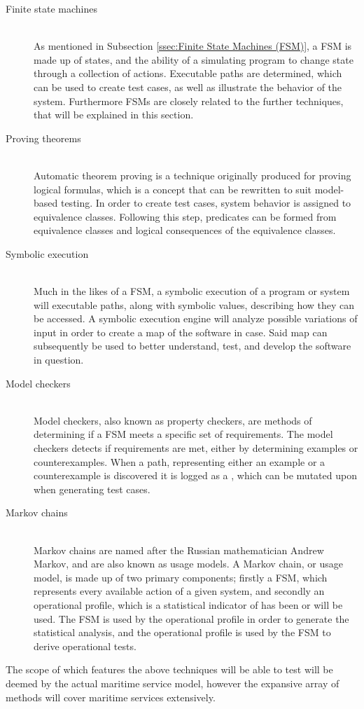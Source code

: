 \begin{description}
	\item[Finite state machines]\ \\
		As mentioned in Subsection \ref{ssec:Finite State Machines (FSM)}, a FSM is made up of states, and the ability of a simulating program to change state through a collection of actions. Executable paths are determined, which can be used to create test cases, as well as illustrate the behavior of the system. Furthermore FSMs are closely related to the further techniques, that will be explained in this section.
	\item[Proving theorems]\ \\
		Automatic theorem proving is a technique originally produced for proving logical formulas, which is a concept that can be rewritten to suit model-based testing. In order to create test cases, system behavior is assigned to equivalence classes. Following this step, predicates can be formed from equivalence classes and logical consequences of the equivalence classes. 
	\item[Symbolic execution]\ \\
		Much in the likes of a FSM, a symbolic execution of a program or system will executable paths, along with symbolic values, describing how they can be accessed. A symbolic execution engine will analyze possible variations of input in order to create a map of the software in case. Said map can subsequently be used to better understand, test, and develop the software in question.
	\item[Model checkers]\ \\
		Model checkers, also known as property checkers, are methods of determining if a FSM meets a specific set of requirements. The model checkers detects if requirements are met, either by determining examples or counterexamples. When a path, representing either an example or a counterexample is discovered it is logged as a , which can be mutated upon when generating test cases.
	\item[Markov chains]\ \\
		Markov chains are named after the Russian mathematician Andrew Markov, and are also known as usage models. A Markov chain, or usage model, is made up of two primary components; firstly a FSM, which represents every available action of a given system, and secondly an operational profile, which is a statistical indicator of has been or will be used. The FSM is used by the operational profile in order to generate the statistical analysis, and the operational profile is used by the FSM to derive operational tests.
\end{description}
The scope of which features the above techniques will be able to test will be deemed by the actual maritime service model, however the expansive array of methods will cover maritime services extensively.
